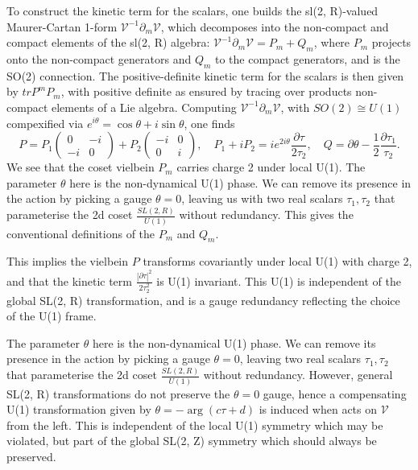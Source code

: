 To construct the kinetic term for the scalars, one builds the sl(2, R)-valued Maurer-Cartan 1-form $\mathcal{V}^{-1}\partial_m\mathcal{V}$, which decomposes into the non-compact and compact elements of the sl(2, R) algebra: $\mathcal{V}^{-1}\partial_m\mathcal{V} = P_m + Q_m$, where $P_m$ projects onto the non-compact generators and $Q_m$ to the compact generators, and is the SO(2) connection.
The positive-definite kinetic term for the scalars is then given by $tr P^m P_m$, with positive definite as ensured by tracing over products non-compact elements of a Lie algebra.
Computing $\mathcal{V}^{-1}\partial_m\mathcal{V}$, with $SO(2)\cong U(1)$ compexified via $e^{i\theta} = \cos\theta + i\sin\theta$, one finds
\begin{equation}
P = P_1\begin{pmatrix}
    0&-i\\-i&0
\end{pmatrix}+P_2\begin{pmatrix}
    -i&0\\0&i
\end{pmatrix},\quad
P_1 + iP_2 = ie^{2i\theta}\frac{\partial \tau}{2 \tau_2},\quad
Q = \partial \theta - \frac{1}{2}\frac{\partial \tau_1}{\tau_2}.
\end{equation}
We see that the coset vielbein $P_m$ carries charge 2 under local U(1). The parameter $\theta$ here is the non-dynamical U(1) phase. 
We can remove its presence in the action by picking a gauge $\theta = 0$, leaving us with two real scalars $\tau_1, \tau_2$ that parameterise the 2d coset $\frac{SL(2, R)}{U(1)}$ without redundancy.
This gives the conventional definitions of the $P_m$ and $Q_m$.

This implies the vielbein $P$ transforms covariantly under local U(1) with charge 2, and that the kinetic term $\frac{|\partial \tau|^2}{2\tau_2^2}$ is U(1) invariant.
This U(1) is independent of the global SL(2, R) transformation, and is a gauge redundancy reflecting the choice of the U(1) frame.

The parameter $\theta$ here is the non-dynamical U(1) phase. 
We can remove its presence in the action by picking a gauge $\theta = 0$, leaving two real scalars $\tau_1, \tau_2$ that parameterise the 2d coset $\frac{SL(2, R)}{U(1)}$ without redundancy.
However, general SL(2, R) transformations do not preserve the $\theta = 0$ gauge, hence a compensating U(1) transformation given by $\theta = - \arg{(c\tau+d)}$ is induced when  acts on $\mathcal{V}$ from the left.
This is independent of the local U(1) symmetry which may be violated, but part of the global SL(2, Z) symmetry which should always be preserved.

